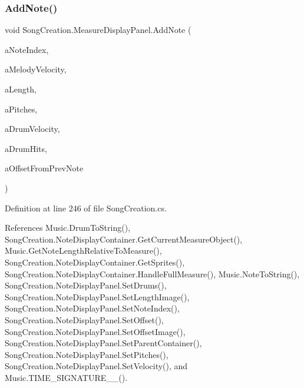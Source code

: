 \subsubsection{\texorpdfstring{Add\+Note()}{AddNote()}}
{\footnotesize\ttfamily void Song\+Creation.\+Measure\+Display\+Panel.\+Add\+Note (\begin{DoxyParamCaption}\item[{int}]{a\+Note\+Index,  }\item[{int}]{a\+Melody\+Velocity,  }\item[{\hyperlink{group___music_enums_gaf11b5f079adbb21c800b9eca1c5c3cbd}{Music.\+N\+O\+T\+E\+\_\+\+L\+E\+N\+G\+TH}}]{a\+Length,  }\item[{\hyperlink{group___music_enums_ga508f69b199ea518f935486c990edac1d}{Music.\+P\+I\+T\+CH} \mbox{[}$\,$\mbox{]}}]{a\+Pitches,  }\item[{int}]{a\+Drum\+Velocity,  }\item[{\hyperlink{group___music_enums_gade475b4382c7066d1af13e7c13c029b6}{Music.\+D\+R\+UM} \mbox{[}$\,$\mbox{]}}]{a\+Drum\+Hits,  }\item[{\hyperlink{group___music_enums_gaf11b5f079adbb21c800b9eca1c5c3cbd}{Music.\+N\+O\+T\+E\+\_\+\+L\+E\+N\+G\+TH}}]{a\+Offset\+From\+Prev\+Note }\end{DoxyParamCaption})}



Definition at line 246 of file Song\+Creation.\+cs.



References Music.\+Drum\+To\+String(), Song\+Creation.\+Note\+Display\+Container.\+Get\+Current\+Measure\+Object(), Music.\+Get\+Note\+Length\+Relative\+To\+Measure(), Song\+Creation.\+Note\+Display\+Container.\+Get\+Sprites(), Song\+Creation.\+Note\+Display\+Container.\+Handle\+Full\+Measure(), Music.\+Note\+To\+String(), Song\+Creation.\+Note\+Display\+Panel.\+Set\+Drums(), Song\+Creation.\+Note\+Display\+Panel.\+Set\+Length\+Image(), Song\+Creation.\+Note\+Display\+Panel.\+Set\+Note\+Index(), Song\+Creation.\+Note\+Display\+Panel.\+Set\+Offset(), Song\+Creation.\+Note\+Display\+Panel.\+Set\+Offset\+Image(), Song\+Creation.\+Note\+Display\+Panel.\+Set\+Parent\+Container(), Song\+Creation.\+Note\+Display\+Panel.\+Set\+Pitches(), Song\+Creation.\+Note\+Display\+Panel.\+Set\+Velocity(), and Music.\+T\+I\+M\+E\+\_\+\+S\+I\+G\+N\+A\+T\+U\+R\+E\+\_\+\_().


